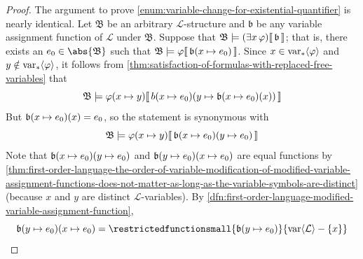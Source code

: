 \begin{proof}
    \vspace{0.3cm}
    \noindent
    The argument to prove \ref{enum:variable-change-for-existential-quantifier} is nearly identical.
    Let \( \mathfrak{B} \) be an arbitrary \( \mathcal{L} \)-structure and \( \mathfrak{b} \) be any variable assignment function of \( \mathcal{L} \) under
    \( \mathfrak{B} \). Suppose that \( \folwffsatisfaction{\mathfrak{B}}{ \mleft( \exists x \, \varphi \mright) }{\mathfrak{b}} \); that is, there exists
    an \( e_{0} \in \abs{\mathfrak{B}} \) such that \(  \folwffsatisfaction{\mathfrak{B}}{ \varphi }{ \folmodifiedvariableassignmentfunction{\mathfrak{b}}{x}{e_{0}} } \).
    Since \( x \in \operatorname{var}_{\ast} \langle\varphi\rangle \) and \( y \notin \operatorname{var}_{\ast} \langle\varphi\rangle \), it follows from
    \cref{thm:satisfaction-of-formulas-with-replaced-free-variables} that
    \begin{equation*}
        \folwffsatisfaction{\mathfrak{B}}{ \folfreevariablereplacement{\varphi}{x}{y} }{ \folmodifiedvariableassignmentfunction{ \folmodifiedvariableassignmentfunction{b}{x}{e_{0}} } {y}{ \folmodifiedvariableassignmentfunction{\mathfrak{b}}{x}{e_{0}}(x) }}
    \end{equation*}
    But \( \folmodifiedvariableassignmentfunction{\mathfrak{b}}{x}{e_{0}}(x) = e_{0} \), so the statement is synonymous with
    \begin{equation*}
        \folwffsatisfaction{\mathfrak{B}}{ \folfreevariablereplacement{\varphi}{x}{y} }{ \folmodifiedvariableassignmentfunction{ \folmodifiedvariableassignmentfunction{\mathfrak{b}}{x}{e_{0}} }{y}{e_{0}} }
    \end{equation*}
    Note that \( \folmodifiedvariableassignmentfunction{ \folmodifiedvariableassignmentfunction{\mathfrak{b}}{x}{e_{0}} }{y}{e_{0}} \)
    and \( \folmodifiedvariableassignmentfunction{ \folmodifiedvariableassignmentfunction{\mathfrak{b}}{y}{e_{0}} }{x}{e_{0}} \) are equal
    functions by \cref{thm:first-order-language-the-order-of-variable-modification-of-modified-variable-assignment-functions-does-not-matter-as-long-as-the-variable-symbols-are-distinct} (because \( x \) and \( y \) are distinct \( \mathcal{L} \)-variables).
    By \cref{dfn:first-order-language-modified-variable-assignment-function},
    \begin{equation*}
        \folmodifiedvariableassignmentfunction{ \folmodifiedvariableassignmentfunction{\mathfrak{b}}{y}{e_{0}} }{x}{e_{0}} =
        \restrictedfunctionsmall{ \folmodifiedvariableassignmentfunction{\mathfrak{b}}{y}{e_{0}} }{ \folvars{\mathcal{L}} - \mleft\{ x \mright\} }

\end{equation*}
\end{proof}
